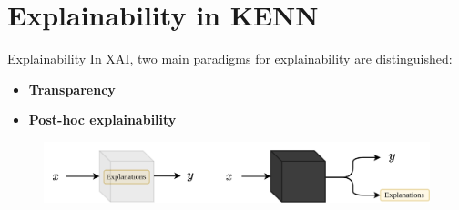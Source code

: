 \documentclass{beamer}
\begin{document}
\section{Explainability in KENN}

%

\begin{frame}{Explainability}
	In XAI, two main paradigms for explainability are distinguished: 
	\begin{itemize}
		\item \textbf{Transparency}
		\item \textbf{Post-hoc explainability}
	\end{itemize}
	\begin{figure}
		\includegraphics[width=\linewidth]{images/trasparency_vs_posthoc.png}
	\end{figure}
\end{frame}

%
\end{document}
